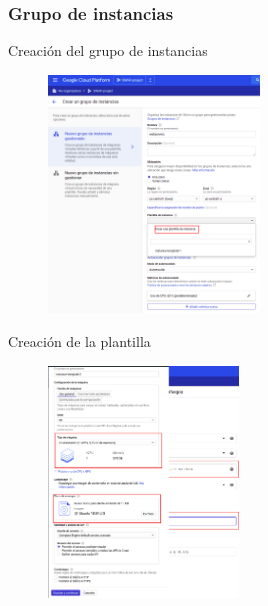 \documentclass{beamer}
\begin{document}
\subsubsection{Grupo de instancias}


\begin{frame}[fragile]{Creación del grupo de instancias}
  \begin{figure}[H]
		\centering
		\includegraphics[width=0.5\textwidth]{project/createig.png}
	\end{figure}
\end{frame}

\begin{frame}[fragile]{Creación de la plantilla}
  \begin{figure}[H]
		\centering
		\includegraphics[width=0.45\textwidth]{project/createtemplate.png}
	\end{figure}
\end{frame}
\end{document}
